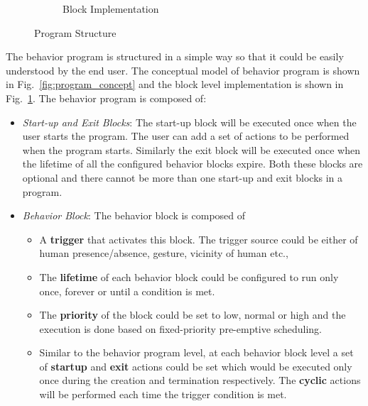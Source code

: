 \documentclass{llncs}
\begin{document}
\begin{figure}
\begin{subfigure}[t]{0.48\textwidth}
\caption[Block Implementation]{Block Implementation}
\label{fig:program_blocks}
\end{subfigure}
\caption[Program Structure]{Program Structure}
\label{fig:program}
\end{figure}
The behavior program is structured in a simple way so that it could be easily understood by the end user. The conceptual model of behavior program is shown in Fig.~\ref{fig:program_concept} and the block level implementation is shown in Fig.~\ref{fig:program_blocks}. The behavior program is composed of:
\begin{itemize}
\item \emph{Start-up and Exit Blocks}: The start-up block will be executed once when the user starts the program. The user can add a set of actions to be performed when the program starts. Similarly the exit block will be executed once when the lifetime of all the configured behavior blocks expire.  Both these blocks are optional and there cannot be more than one start-up and exit blocks in a program.
\item \emph{Behavior Block}: The behavior block is composed of
\begin{itemize}
\item A \textbf{trigger} that activates this block. The trigger source could be either of human presence/absence, gesture, vicinity of human etc.,
\item The \textbf{lifetime} of each behavior block could be configured to run only once, forever or until a condition is met. 
\item The \textbf{priority} of the block could be set to low, normal or high and the execution is done based on fixed-priority pre-emptive scheduling.
\item Similar to the behavior program level, at each behavior block level a set of \textbf{startup} and \textbf{exit} actions could be set which would be executed only once during the creation and termination respectively. The \textbf{cyclic} actions will be performed each time the trigger condition is met.
\end{itemize}
\end{itemize}
\end{document}
